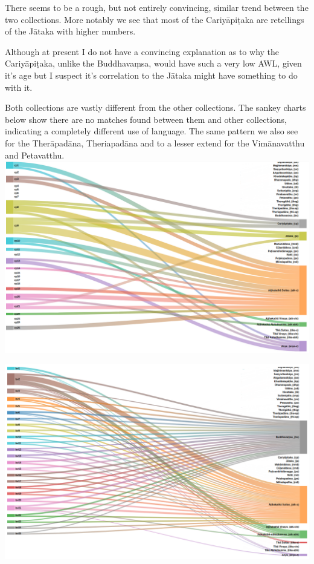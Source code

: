 \medskip
There seems to be a rough, but not entirely convincing, similar trend between the two collections. More notably we see that most of the Cariyāpiṭaka are retellings of the Jātaka with higher numbers. 

Although at present I do not have a convincing explanation as to why the Cariyāpiṭaka, unlike the Buddhavaṃsa, would have such a very low AWL, given it's age but I suspect it's correlation to the Jātaka might have something to do with it.

Both collections are vastly different from the other collections. The sankey charts below show there are no matches found between them and other collections, indicating a completely different use of language. The same pattern we also see for the Therāpadāna, Theriapadāna and to a lesser extend for the Vimānavatthu and Petavatthu.\\

\includegraphics[width=\linewidth]{cp.png}
\label{cp}

\medskip
\includegraphics[width=\linewidth]{bv.png}
\label{bv}

